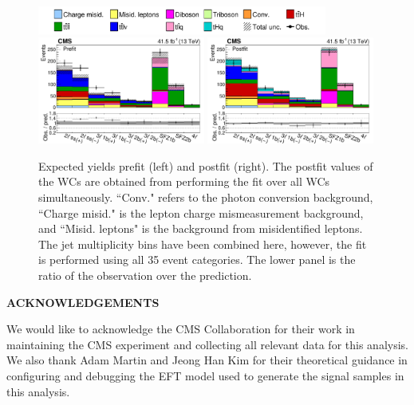 \documentclass[12pt]{article}
\def\Acknowledgements{\bigskip  \bigskip \begin{center} \begin{large}
             \bf ACKNOWLEDGEMENTS \end{large}\end{center}}
\begin{document}
\begin{figure}[htbp]
	\centering
	\includegraphics[width=0.85\textwidth]{plots/yields_leg.pdf} \\
	\includegraphics[width=0.49\textwidth]{plots/yields_prefit.pdf}
	\includegraphics[width=0.49\textwidth]{plots/yields_postfit.pdf}
	\caption{Expected yields prefit (left) and postfit (right). The postfit values of the WCs are obtained from performing the fit over all WCs simultaneously. ``Conv." refers to the photon conversion background, ``Charge misid." is the lepton charge mismeasurement background, and ``Misid. leptons" is the background from misidentified leptons.  The jet multiplicity bins have been combined here, however, the fit is performed using all 35 event categories. The lower panel is the ratio of the observation over the prediction.}
	\label{fig:postfit-yields}
\end{figure}



\Acknowledgements
We would like to acknowledge the CMS Collaboration for their work in maintaining the CMS experiment and collecting all relevant data for this analysis. We also thank Adam Martin and Jeong Han Kim for their theoretical guidance in configuring and debugging the EFT model used to generate the signal samples in this analysis.






 
\end{document}
